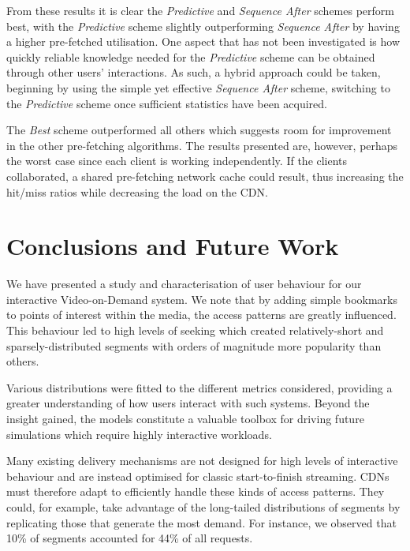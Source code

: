 \documentclass[a4paper,11pt]{article}
\begin{document}
From these results it is clear the \emph{Predictive} and \emph{Sequence After} schemes perform best, with the \emph{Predictive} scheme slightly outperforming \emph{Sequence After} by having a higher pre-fetched utilisation. One aspect that has not been investigated is how quickly reliable knowledge needed for the \emph{Predictive} scheme can be obtained through other users' interactions. As such, a hybrid approach could be taken, beginning by using the simple yet effective \emph{Sequence After} scheme, switching to the \emph{Predictive} scheme once sufficient statistics have been acquired.

The \emph{Best} scheme outperformed all others which suggests room for improvement in the other pre-fetching algorithms. The results presented are, however, perhaps the worst case since each client is working independently. If the clients collaborated, a shared pre-fetching network cache could result, thus increasing the hit/miss ratios while decreasing the load on the CDN.

\section{Conclusions and Future Work}
\label{sect:conclusion}


We have presented a study and characterisation of user behaviour for our interactive Video-on-Demand system. We note that by adding simple bookmarks to points of interest within the media, the access patterns are greatly influenced. This behaviour led to high levels of seeking which created relatively-short and sparsely-distributed segments with orders of magnitude more popularity than others.

Various distributions were fitted to the different metrics considered, providing a greater understanding of how users interact with such systems. Beyond the insight gained, the models constitute a valuable toolbox for driving future simulations which require highly interactive workloads.

Many existing delivery mechanisms are not designed for high levels of interactive behaviour and are instead optimised for classic start-to-finish streaming. CDNs must therefore adapt to efficiently handle these kinds of access patterns. They could, for example, take advantage of the long-tailed distributions of segments by replicating those that generate the most demand. For instance, we observed that 10\% of segments accounted for 44\% of all requests.
\end{document}
